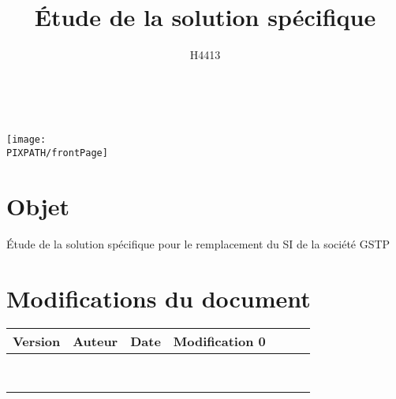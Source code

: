 \documentclass[twoside]{article}
\title{Étude de la solution spécifique}
\author{H4413}
\newcommand\PIXPATH{./docs/pics}
\newcommand\Object{Étude de la solution spécifique pour le remplacement du SI de la société GSTP}
\begin{document}



\maketitle

\thispagestyle{empty}

\hfill\\
\vfill


\begin{center}
    \texttt{[image: \\PIXPATH/frontPage]}
\end{center}

\section*{Objet}
\Object



\section*{Modifications du document}

\begin{center}
\begin{longtable}{|m{14mm}|m{36mm}|m{36mm}|m{60mm}|}
\hline
Version & Auteur & Date & Modification\endhead \hline
0
& %
& %
& %
\\\hline
& %
& %
& %
\\\hline
& %
& %
& %
\\\hline
& %
& %
& %
\\\hline
& %
& %
& %
\\\hline
& %
& %
& %
\\\hline
& %
& %
& %
\\\hline
& %
& %
& %
\\\hline
& %
& %
& %
\\\hline

\end{longtable}
\end{center}
\end{document}
